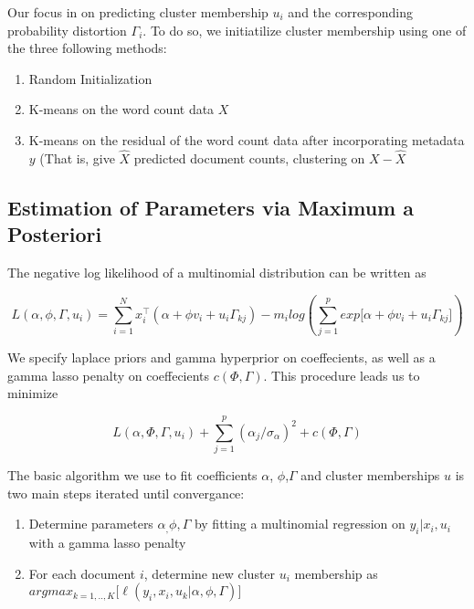 \documentclass[12pt]{article}
\begin{document}
Our focus in on predicting cluster membership $u_i$ and the
corresponding probability distortion $\Gamma_i$. To do so, we
initiatilize cluster membership using one of the three following
methods:

\begin{enumerate}
\def\labelenumi{\arabic{enumi}.}
\itemsep1pt\parskip0pt
\item
  Random Initialization
\item
  K-means on the word count data $X$
\item
  K-means on the residual of the word count data after incorporating
  metadata $y$ (That is, give $\hat{X}$ predicted document counts,
  clustering on $X-\hat{X}$
\end{enumerate}

\subsection{Estimation of Parameters via Maximum a
Posteriori}\label{estimation-of-parameters-via-maximum-a-posteriori}

The negative log likelihood of a multinomial distribution can be written
as

\begin{equation} 
L(\alpha,\phi,\Gamma,u_i) = \sum_{i = 1}^{N}{ x_i^\top (\alpha + \phi v_i + u_i \Gamma_{kj})} - m_i log(\sum_{j = 1}^{p}{exp{\big[ \alpha + \phi v_i + u_i \Gamma_{kj} \big]}})
\end{equation}

We specify laplace priors and gamma hyperprior on coeffecients, as well
as a gamma lasso penalty on coeffecients $c(\Phi,\Gamma)$. This
procedure leads us to minimize

\[L(\alpha,\Phi,\Gamma,u_i) + \sum_{j=1}^{p}(\alpha_j/ \sigma_\alpha)^2 + c(\Phi,\Gamma) \]

The basic algorithm we use to fit coefficients $\alpha$, $\phi$,$\Gamma$
and cluster memberships $u$ is two main steps iterated until
convergance:

\begin{enumerate}
\def\labelenumi{\arabic{enumi}.}
\item
  Determine parameters $\alpha_, \phi, \Gamma$ by fitting a multinomial
  regression on $y_i | x_i , u_i$ with a gamma lasso penalty
\item
  For each document $i$, determine new cluster $u_i$ membership as
  $argmax_{k = 1,..,K} \big[  \ell(y_i,x_i,u_k | \alpha, \phi, \Gamma) \big]$
\end{enumerate}
\end{document}

